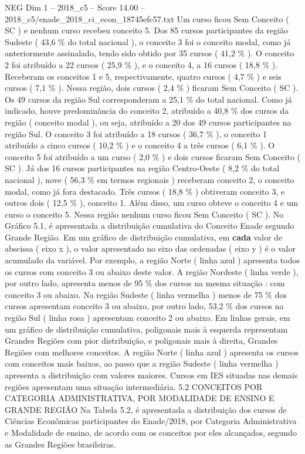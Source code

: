 \begin{textsample}{NEG Dim 1 – 2018\_c5 – Score 14.00 – 2018\_c5/enade\_2018\_ci\_econ\_18745efc57.txt}
Um curso ficou Sem Conceito ( SC ) e nenhum curso recebeu conceito 5.
Dos 85 cursos participantes da região Sudeste ( 43,6 \% do total nacional ), o conceito 3 foi o conceito modal, como já anteriormente assinalado, tendo sido obtido por 35 cursos ( 41,2 \% ).
O conceito 2 foi atribuído a 22 cursos ( 25,9 \% ), e o conceito 4, a 16 cursos ( 18,8 \% ).
Receberam os conceitos 1 e 5, respectivamente, quatro cursos ( 4,7 \% ) e seis cursos ( 7,1 \% ).
Nessa região, dois cursos ( 2,4 \% ) ficaram Sem Conceito ( SC ).
Os 49 cursos da região Sul corresponderam a 25,1 \% do total nacional.
Como já indicado, houve predominância do conceito 2, atribuído a 40,8 \% dos cursos da região ( conceito modal ), ou seja, atribuído a 20 dos 49 cursos participantes na região Sul.
O conceito 3 foi atribuído a 18 cursos ( 36,7 \% ), o conceito 1 atribuído a cinco cursos ( 10,2 \% ) e o conceito 4 a três cursos ( 6,1 \% ).
O conceito 5 foi atribuído a um curso ( 2,0 \% ) e dois cursos ficaram Sem Conceito ( SC ).
Já dos 16 cursos participantes na região Centro-Oeste ( 8,2 \% do total nacional ), nove ( 56,3 \% em termos regionais ) receberam conceito 2, o conceito modal, como já fora destacado.
Três cursos ( 18,8 \% ) obtiveram conceito 3, e outros dois ( 12,5 \% ), conceito 1.
Além disso, um curso obteve o conceito 4 e um curso o conceito 5.
Nessa região nenhum curso ficou Sem Conceito ( SC ).
No Gráfico 5.1, é apresentada a distribuição cumulativa do Conceito Enade segundo Grande Região.
Em um gráfico de distribuição cumulativa, em \textbf{cada} valor de abscissa ( eixo x ), o valor apresentado no eixo das ordenadas ( eixo y ) é o valor acumulado da variável.
Por exemplo, a região Norte ( linha azul ) apresenta todos os cursos com conceito 3 ou abaixo deste valor.
A região Nordeste ( linha verde ), por outro lado, apresenta menos de 95 \% dos cursos na mesma situação : com conceito 3 ou abaixo.
Na região Sudeste ( linha vermelha ) menos de 75 \% dos cursos apresentam conceito 3 ou abaixo, por outro lado, 53,2 \% dos cursos na região Sul ( linha rosa ) apresentam conceito 2 ou abaixo.
Em linhas gerais, em um gráfico de distribuição cumulativa, poligonais mais à esquerda representam Grandes Regiões com pior distribuição, e poligonais mais à direita, Grandes Regiões com melhores conceitos.
A região Norte ( linha azul ) apresenta os cursos com conceitos mais baixos, ao passo que a região Sudeste ( linha vermelha ) apresenta a distribuição com valores maiores.
Cursos em IES situadas nas demais regiões apresentam uma situação intermediária. 5.2 CONCEITOS POR CATEGORIA ADMINISTRATIVA, POR MODALIDADE DE ENSINO E GRANDE REGIÃO Na Tabela 5.2, é apresentada a distribuição dos cursos de Ciências Econômicas participantes do Enade/2018, por Categoria Administrativa e Modalidade de ensino, de acordo com os conceitos por eles alcançados, segundo as Grandes Regiões brasileiras.

\end{textsample}
